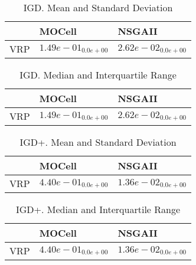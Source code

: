 \documentclass{article}
\begin{document}
\begin{table}
\caption{IGD. Mean and Standard Deviation}
\label{table: IGD}
\centering
\begin{scriptsize}
\begin{tabular}{lll}
\hline & MOCell &  NSGAII\\
\hline 
VRP & \cellcolor{gray25}$  1.49e-01_{ 0.0e+00}$ & \cellcolor{gray95}$  2.62e-02_{ 0.0e+00}$ \\
\hline
\end{tabular}
\end{scriptsize}
\end{table}

\begin{table}
\caption{IGD. Median and Interquartile Range}
\label{table: IGD}
\centering
\begin{scriptsize}
\begin{tabular}{lll}
\hline & MOCell &  NSGAII\\
\hline 
VRP & \cellcolor{gray25}$  1.49e-01_{ 0.0e+00}$ & \cellcolor{gray95}$  2.62e-02_{ 0.0e+00}$ \\
\hline
\end{tabular}
\end{scriptsize}
\end{table}

\begin{table}
\caption{IGD+. Mean and Standard Deviation}
\label{table: IGD+}
\centering
\begin{scriptsize}
\begin{tabular}{lll}
\hline & MOCell &  NSGAII\\
\hline 
VRP & \cellcolor{gray25}$  4.40e-01_{ 0.0e+00}$ & \cellcolor{gray95}$  1.36e-02_{ 0.0e+00}$ \\
\hline
\end{tabular}
\end{scriptsize}
\end{table}

\begin{table}
\caption{IGD+. Median and Interquartile Range}
\label{table: IGD+}
\centering
\begin{scriptsize}
\begin{tabular}{lll}
\hline & MOCell &  NSGAII\\
\hline 
VRP & \cellcolor{gray25}$  4.40e-01_{ 0.0e+00}$ & \cellcolor{gray95}$  1.36e-02_{ 0.0e+00}$ \\
\hline
\end{tabular}
\end{scriptsize}
\end{table}
\end{document}
